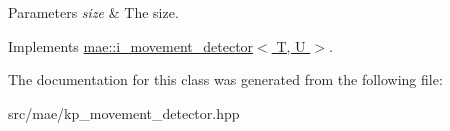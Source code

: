 \begin{DoxyParams}{Parameters}
{\em size} & The size. \\
\hline
\end{DoxyParams}


Implements \hyperlink{classmae_1_1i__movement__detector_a96a923c5bab2dbed81daf4cadc885497}{mae\-::i\-\_\-movement\-\_\-detector$<$ T, U $>$}.



The documentation for this class was generated from the following file\-:\begin{DoxyCompactItemize}
\item 
src/mae/kp\-\_\-movement\-\_\-detector.\-hpp\end{DoxyCompactItemize}
